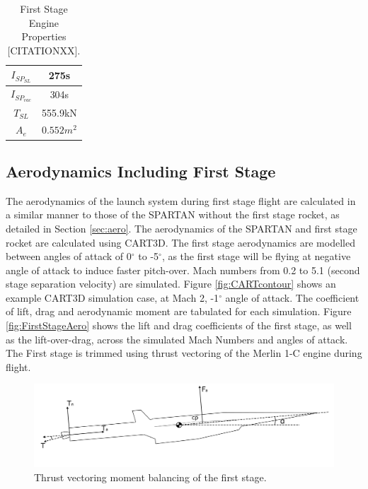 \begin{table}[h]
	\centering
	\begin{tabular}{|c|c|}
		\hline  $I_{SP_{SL}}$ & 275s \\ 
		\hline  $I_{SP_{vac}}$ & 304s\\ 
		\hline  $T_{SL}$ & 555.9kN \\ 
		\hline  $A_{e}$ & $0.552m^2$ \\ 
		\hline 
	\end{tabular} 
	\caption{First Stage Engine Properties [CITATIONXX].}
	\label{tab:1stStageEngine}
\end{table}


  \subsection{Aerodynamics Including First Stage}\label{sec:firststageaero}
  
  The aerodynamics of the launch system during first stage flight are calculated in a similar manner to those of the SPARTAN without the first stage rocket, as detailed in Section \ref{sec:aero}. 
  The aerodynamics of the SPARTAN and first stage rocket are calculated using CART3D. The first stage aerodynamics are modelled between angles of attack of 0$^\circ$ to -5$^\circ$, as the first stage will be flying at negative angle of attack to induce faster pitch-over. Mach numbers from 0.2 to 5.1 (second stage separation velocity) are simulated. Figure \ref{fig:CARTcontour} shows an example CART3D simulation case, at Mach 2, -1$^\circ$ angle of attack. The coefficient of lift, drag and aerodynamic moment are tabulated for each simulation. Figure \ref{fig:FirstStageAero} shows the lift and drag coefficients of the first stage, as well as the lift-over-drag, across the simulated Mach Numbers and angles of attack. 
  The First stage is trimmed using thrust vectoring of the Merlin 1-C engine during flight.
  
 
  
\begin{figure}
\centering
\includegraphics[width=0.9\linewidth]{figures/3_vehicle_design/FirstStageThrustVec}
\caption{Thrust vectoring moment balancing of the first stage. }
\label{fig:FirstStageThrustVec}
\end{figure}
  
